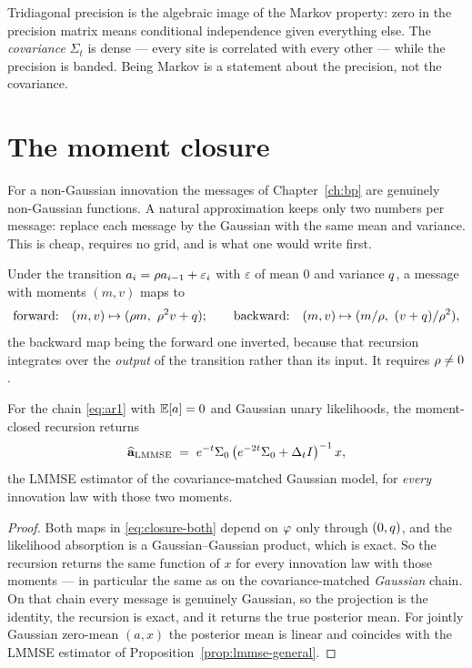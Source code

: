 \begin{intuition}
Tridiagonal precision is the algebraic image of the Markov property: zero in the precision
matrix means conditional independence given everything else. The \emph{covariance} $\Sigma_t$
is dense --- every site is correlated with every other --- while the precision is banded. Being
Markov is a statement about the precision, not the covariance.
\end{intuition}

\section{The moment closure}
\label{sec:closure-chapter}

For a non-Gaussian innovation the messages of Chapter~\ref{ch:bp} are genuinely non-Gaussian
functions. A natural approximation keeps only two numbers per message: replace each message by
the Gaussian with the same mean and variance. This is cheap, requires no grid, and is what one
would write first.

Under the transition $a_i = \rho a_{i-1}+\varepsilon_i$ with $\varepsilon$ of mean $0$ and
variance $q$, a message with moments $(m,v)$ maps to
\begin{equation}
\label{eq:closure-both}
\text{forward:}\quad (m,v)\mapsto(\corr m,\ \corr^2 v + \ivar);
\qquad
\text{backward:}\quad (m,v)\mapsto(m/\corr,\ (v+\ivar)/\corr^2),
\end{equation}
the backward map being the forward one inverted, because that recursion integrates over the
\emph{output} of the transition rather than its input. It requires $\rho\neq0$.

\begin{proposition}
\label{prop:closure-lmmse}
For the chain \eqref{eq:ar1} with $\mathbb{E}[a]=0$ and Gaussian unary likelihoods, the moment-closed
recursion returns
\begin{equation}
\label{eq:lmmse-chapter}
\widehat{\mathbf{a}}_{\mathrm{LMMSE}} \;=\; e^{-t}\Sigma_0\left(e^{-2t}\Sigma_0+\Delta_t I\right)^{-1}x ,
\end{equation}
the LMMSE estimator of the covariance-matched Gaussian model, for \emph{every} innovation law
with those two moments.
\end{proposition}

\begin{proof}
Both maps in \eqref{eq:closure-both} depend on $\varphi$ only through $(0,q)$, and the
likelihood absorption is a Gaussian--Gaussian product, which is exact. So the recursion returns
the same function of $x$ for every innovation law with those moments --- in particular the same
as on the covariance-matched \emph{Gaussian} chain. On that chain every message is genuinely
Gaussian, so the projection is the identity, the recursion is exact, and it returns the true
posterior mean. For jointly Gaussian zero-mean $(a,x)$ the posterior mean is linear and
coincides with the LMMSE estimator of Proposition~\ref{prop:lmmse-general}.
\end{proof}

